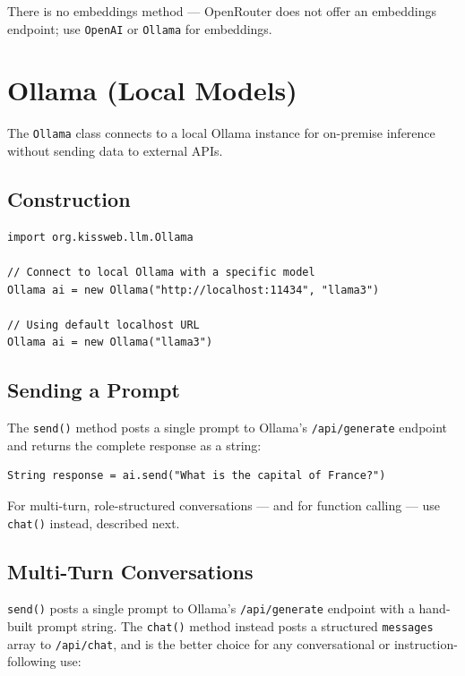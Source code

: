 \noindent
There is no embeddings method --- OpenRouter does not offer an embeddings endpoint; use \texttt{OpenAI} or \texttt{Ollama} for embeddings.

\section{Ollama (Local Models)}
\label{sec:llm-ollama}

The \texttt{Ollama} class connects to a local Ollama instance for on-premise inference without sending data to external APIs.

\subsection{Construction}

\begin{lstlisting}[style=groovy]
import org.kissweb.llm.Ollama

// Connect to local Ollama with a specific model
Ollama ai = new Ollama("http://localhost:11434", "llama3")

// Using default localhost URL
Ollama ai = new Ollama("llama3")
\end{lstlisting}

\subsection{Sending a Prompt}

The \texttt{send()} method posts a single prompt to Ollama's \texttt{/api/generate} endpoint and returns the complete response as a string:

\begin{lstlisting}[style=groovy]
String response = ai.send("What is the capital of France?")
\end{lstlisting}

\noindent
For multi-turn, role-structured conversations --- and for function calling --- use \texttt{chat()} instead, described next.

\subsection{Multi-Turn Conversations}

\texttt{send()} posts a single prompt to Ollama's \texttt{/api/generate} endpoint with a hand-built prompt string.  The \texttt{chat()} method instead posts a structured \texttt{messages} array to \texttt{/api/chat}, and is the better choice for any conversational or instruction-following use:

